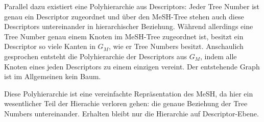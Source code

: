 Parallel dazu existiert eine Polyhierarchie aus Descriptors: Jeder Tree Number ist genau ein Descriptor zugeordnet und über den MeSH-Tree stehen auch diese Descriptors untereinander in hierarchischer Beziehung. Während allerdings eine Tree Number genau einem Knoten im MeSH-Tree zugeordnet ist, besitzt ein Descriptor so viele Kanten in $G_M$, wie er Tree Numbers besitzt. Anschaulich gesprochen entsteht die Polyhierarchie der Descriptors aus $G_M$, indem alle Knoten eines jeden Descriptors zu einem einzigen vereint. Der entstehende Graph ist im Allgemeinen kein Baum. \par
Diese Polyhierarchie ist eine vereinfachte Repräsentation des MeSH, da hier ein wesentlicher Teil der Hierachie verloren gehen: die genaue Beziehung der Tree Numbers untereinander. Erhalten bleibt nur die Hierarchie auf Descriptor-Ebene. \par




